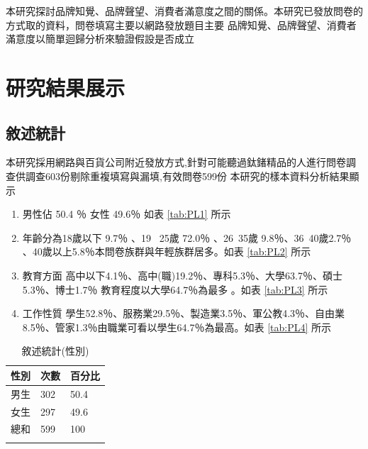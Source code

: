 本研究探討品牌知覺、品牌聲望、消費者滿意度之間的關係。本研究已發放問卷的方式取的資料，問卷填寫主要以網路發放題目主要
品牌知覺、品牌聲望、消費者滿意度以簡單迴歸分析來驗證假設是否成立

\chapter{研究結果展示}
\section{敘述統計}
本研究採用網路與百貨公司附近發放方式,針對可能聽過鈦鍺精品的人進行問卷調查供調查603份剔除重複填寫與漏填,有效問卷599份 
本研究的樣本資料分析結果顯示 
\begin{enumerate}
\item 男性佔 50.4 ％ 女性 49.6％ 如表 \ref{tab:PL1} 所示 
\item 年齡分為18歲以下 9.7％ 、19 ~25歲 72.0％ 、26~35歲 9.8％、36~40歲2.7％ 、40歲以上5.8％本問卷族群與年輕族群居多。如表  \ref{tab:PL2} 所示
\item 教育方面 高中以下4.1％、高中(職)19.2％、專科5.3％、大學63.7％、碩士5.3％、博士1.7％ 教育程度以大學64.7％為最多 。如表 \ref{tab:PL3} 所示
\item 工作性質 學生52.8％、服務業29.5％、製造業3.5％、軍公教4.3％、自由業8.5％、管家1.3％由職業可看以學生64.7％為最高。如表 \ref{tab:PL4} 所示
\end{enumerate}

\begin{table}[h]
\caption{敘述統計(性別)}
\label{tab:PL1}
\renewcommand{\arraystretch}{1.2} %
\arrayrulewidth=1pt               %
\tabcolsep=60pt                   %
%
\begin{tabular}[t]{lll}  %
\hline
 性別&次數 & 百分比 \\
\hline
男生        & 302 & 50.4 \\
女生        & 297  & 49.6 \\
總和        & 599  & 100 \\
\hline
\centering
\label{fig:PL4}
\end{tabular}
\end{table}

